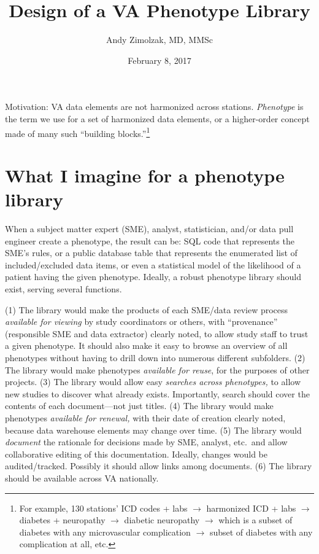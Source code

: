 \documentclass{tufte-handout}
\title{Design of a VA Phenotype Library}
\author{Andy Zimolzak, MD, MMSc}
\date{February 8, 2017}
\begin{document}
\maketitle

Motivation: VA data elements are not harmonized across stations.
\emph{Phenotype} is the term we use for a set of harmonized data
elements, or a higher-order concept made of many such ``building
blocks.''\footnote{For example, 130 stations' ICD codes + labs
  $\to$ harmonized ICD + labs $\to$ diabetes + neuropathy $\to$
  diabetic neuropathy $\to$ which is a subset of diabetes with any
  microvascular complication $\to$ subset of diabetes with any
  complication at all, etc.}

\section{What I imagine for a phenotype library}

When a subject matter expert (SME), analyst, statistician, and/or data
pull engineer create a phenotype, the result can be: SQL
code that represents the SME's rules, or a public database table that
represents the enumerated list of included/excluded data items, or
even a statistical model of the likelihood of a patient having the
given phenotype. Ideally, a robust phenotype library should exist,
serving several functions.

(1) The library would make the products of each SME/data review
process \emph{available for viewing} by study coordinators or others,
with ``provenance'' (responsible SME and data extractor) clearly
noted, to allow study staff to trust a given phenotype. It should also
make it easy to browse an overview of all phenotypes without having to
drill down into numerous different subfolders. (2) The library would
make phenotypes \emph{available for reuse}, for the purposes of other
projects. (3) The library would allow easy \emph{searches across
  phenotypes,} to allow new studies to discover what already exists.
Importantly, search should cover the contents of each document---not
just titles. (4) The library would make phenotypes \emph{available for
  renewal,} with their date of creation clearly noted, because data
warehouse elements may change over time. (5) The library would
\emph{document} the rationale for decisions made by SME, analyst,
etc.\ and allow collaborative editing of this documentation. Ideally,
changes would be audited/tracked. Possibly it should allow links among
documents. (6) The library should be available across VA nationally.
\end{document}
